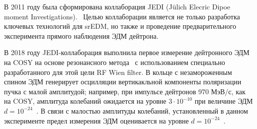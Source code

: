 В 2011 году была сформирована коллаборация JEDI (J\"ulich Elecric Dipoe moment Investigations).~\cite{JEDI:Website} 
Целью коллаборации является не только разработка ключевых технологий для srEDM, но также и проведение предварительного эксперимента прямого наблюдения ЭДМ дейтрона. 

В 2018 году JEDI-коллаборация выполнила первое измерение дейтронного ЭДМ на COSY на основе резонансного метода~\cite{COSY:Partially-Frozen-Spin, COSY:SpinTuneMapping} 
с использованием специально разработанного для этой цели RF Wien filter.%
В кольце с незамороженным спином 
ЭДМ генерирует осцилляции вертикакльной компоненты поляризации пучка с малой амплитудой; например, 
при импульсе дейтронов 970 МэВ/с, как на COSY, амплитуда колебаний ожидается на уровне 
$3\cdot10^{-10}$ при величине ЭДМ $d = 10^{-24}$~\ecm. В связи с малостью амплитуды колебаний, установленный в данном эксперименте предел измерения ЭДМ оценивается на уровне $d=10^{-24}$~\ecm.

